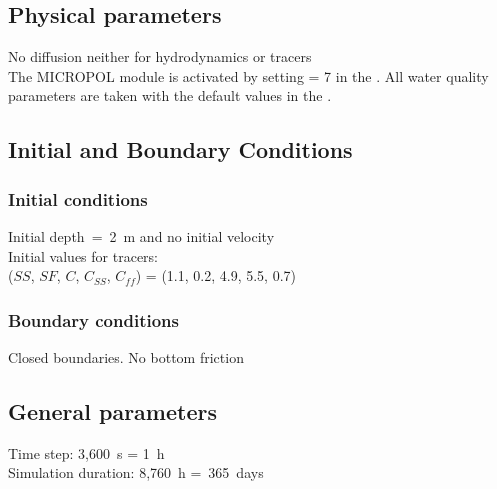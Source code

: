 \subsection{Physical parameters}
%
No diffusion neither for hydrodynamics or tracers\\
%
The MICROPOL module is activated by setting  = 7
in the  .
%
All water quality parameters are taken with the default values
in the \waqtel {}.
%
%
%
%
%
%
\subsection{Initial and Boundary Conditions}
%
\subsubsection{Initial conditions}
%
Initial depth~=~2~m
and no initial velocity\\
Initial values for tracers:\\
($SS$, $SF$, $C$, $C_{SS}$, $C_{ff}$) =
(1.1, 0.2, 4.9, 5.5, 0.7)
%
\subsubsection{Boundary conditions}
%
Closed boundaries. No bottom friction
%
\subsection{General parameters}
%
Time step: 3,600~s = 1~h\\
Simulation duration: 8,760~h =~365~days
%
%
%
